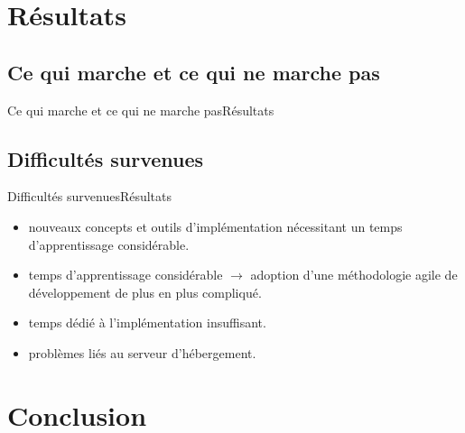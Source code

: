 \documentclass[usenames,dvipsnames]{beamer}
\begin{document}
\section{Résultats}
\subsection{Ce qui marche et ce qui ne marche pas}
\begin{frame}{Ce qui marche et ce qui ne marche pas}{Résultats}

\end{frame}
\subsection{Difficultés survenues}
\begin{frame}{Difficultés survenues}{Résultats}
  \begin{itemize}
    \item nouveaux concepts et outils d'implémentation nécessitant un temps d'apprentissage considérable.
    \item temps d'apprentissage considérable $\rightarrow$ adoption d'une méthodologie agile de développement de plus en plus compliqué.
    \item temps dédié à l'implémentation insuffisant.
    \item problèmes liés au serveur d'hébergement.
  \end{itemize}
\end{frame}
\section{Conclusion}
\end{document}
